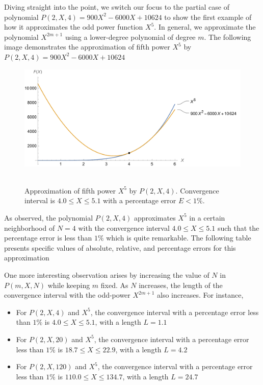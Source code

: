 Diving straight into the point, we switch our focus to the partial case of polynomial
$P(2,X,4) = 900X^2 - 6000X + 10624$
to show the first example of how it approximates the odd power function $X^5$.
In general, we approximate the polynomial $X^{2m+1}$ using a lower-degree polynomial of degree $m$.
The following image demonstrates the approximation of fifth power $X^5$ by
$P(2,X,4) = 900X^2 - 6000X + 10624$
\begin{figure}[H]
    \centering
    \includegraphics[width=1\textwidth]{sections/images/03_plots_polynomial_p2_n4_with_fifth}
    ~\caption{Approximation of fifth power $X^5$ by $P(2, X, 4)$.
    Convergence interval is $4.0 \leq X \leq 5.1$ with a percentage error $E < 1\%$.
    }\label{fig:03_plots_polynomial_p2_n4_with_fifth}
\end{figure}
As observed, the polynomial $P(2, X, 4)$ approximates $X^5$ in a certain neighborhood of $N=4$ with
the convergence interval $4.0 \leq X \leq 5.1$ such that the percentage error is less than $1\%$ which is quite remarkable.
The following table presents specific values of absolute, relative, and percentage errors for this approximation


One more interesting observation arises by increasing the value of $N$ in $P(m, X, N)$ while keeping $m$ fixed.
As $N$ increases, the length of the convergence interval with the odd-power $X^{2m+1}$ also increases.
For instance,
\begin{itemize}
    \item For $P(2, X, 4)$ and $X^5$, the convergence interval with a percentage error less than $1\%$ is $4.0 \leq X \leq 5.1$, with a length $L=1.1$
    \item For $P(2, X, 20)$ and $X^5$, the convergence interval with a percentage error less than $1\%$ is $18.7 \leq X \leq 22.9$, with a length $L=4.2$
    \item For $P(2, X, 120)$ and $X^5$, the convergence interval with a percentage error less than $1\%$ is $110.0 \leq X \leq 134.7$, with a length $L=24.7$
\end{itemize}

